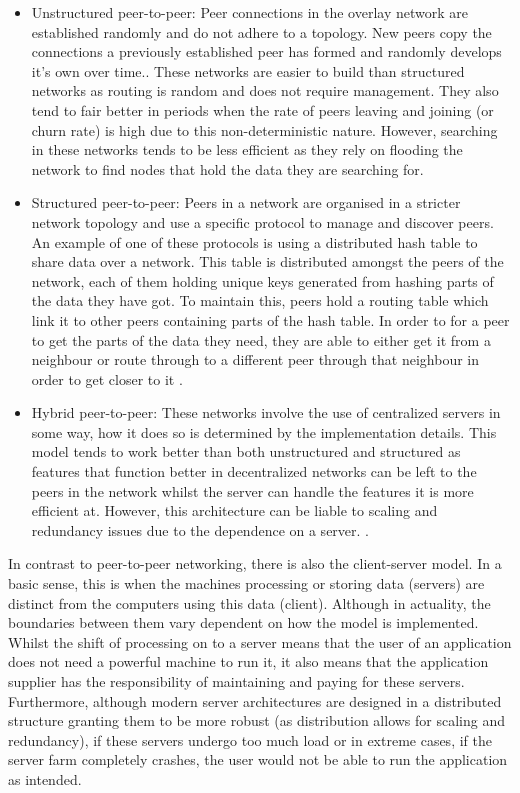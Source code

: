 \documentclass[]{report}
\begin{document}
	\begin{itemize}
		\item Unstructured peer-to-peer:
		Peer connections in the overlay network are established randomly and do not adhere to a topology. New peers copy the connections a previously established peer has formed and randomly develops it's own over time.\cite{P2P overlay networks}. These networks are easier to build than structured networks as routing is random and does not require management. They also tend to fair better in periods when the rate of peers leaving and joining (or churn rate) is high due to this non-deterministic nature. However, searching in these networks tends to be less efficient as they rely on flooding the network to find nodes that hold the data they are searching for.
		\item Structured peer-to-peer:
		Peers in a network are organised in a stricter network topology and use a specific protocol to manage and discover peers. An example of one of these protocols is using a distributed hash table to share data over a network. This table is distributed amongst the peers of the network, each of them holding unique keys generated from hashing parts of the data they have got. To maintain this, peers hold a routing table which link it to other peers containing parts of the hash table. In order to for a peer to get the parts of the data they need, they are able to either get it from a neighbour or route through to a different peer through that neighbour in order to get closer to it \cite{P2P overlay networks}. 
		\item Hybrid peer-to-peer:
		These networks involve the use of centralized servers in some way, how it does so is determined by the implementation details. This model tends to work better than both unstructured and structured as features that function better in decentralized networks can be left to the peers in the network whilst the server can handle the features it is more efficient at. However, this architecture can be liable to scaling and redundancy issues due to the dependence on a server. \cite{Hybrid P2P network}.
	\end{itemize}
				
	In contrast to peer-to-peer networking, there is also the client-server model. In a basic sense, this is when the machines processing or storing data (servers) are distinct from the computers using this data (client). Although in actuality, the boundaries between them vary dependent on how the model is implemented. Whilst the shift of processing on to a server means that the user of an application does not need a powerful machine to run it, it also means that the application supplier has the responsibility of maintaining and paying for these servers. Furthermore, although modern server architectures are designed in a distributed structure granting them to be more robust (as distribution allows for scaling and redundancy), if these servers undergo too much load or in extreme cases, if the server farm completely crashes, the user would not be able to run the application as intended.
	
\end{document}
